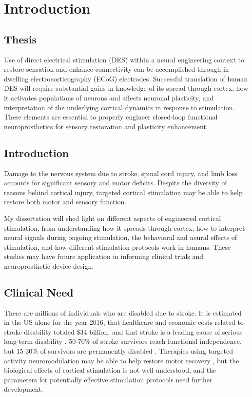 
 
\chapter {Introduction}

\section {Thesis}

Use of direct electrical stimulation (DES) within a neural engineering context to restore sensation and enhance connectivity can be accomplished through in-dwelling electrocorticography (ECoG) electrodes.  Successful translation of human DES will require substantial gains in knowledge of its spread through cortex, how it activates populations of neurons and affects neuronal plasticity, and interpretation of the underlying cortical dynamics in response to stimulation. These elements are essential to properly engineer closed-loop functional neuroprosthetics for sensory restoration and plasticity enhancement.  

\section{Introduction}

Damage to the nervous system due to stroke, spinal cord injury, and limb loss accounts for significant sensory and motor deficits. Despite the diversity of reasons behind cortical injury, targeted cortical stimulation may be able to help restore both motor and sensory function.  

My dissertation will shed light on different aspects of engineered cortical stimulation, from understanding how it spreads through cortex, how to interpret neural signals during ongoing stimulation, the behavioral and neural effects of stimulation, and how different stimulation protocols work in humans. These studies may have future application in informing clinical trials and neuroprosthetic device design. 

\section{Clinical Need}

There are millions of individuals who are disabled due to stroke. It is estimated in the US alone for the year 2016, that healthcare and economic costs related to stroke disability totaled \$34 billion, and that stroke is a leading cause of serious long-term disability \cite{CDC2015}. 50-70\% of stroke survivors reach functional independence, but 15-30\% of survivors are permanently disabled \cite{Lloyd-Jones2010}. Therapies using targeted activity neuromodulation may be able to help restore motor recovery \cite{HarveyRL.WinsteinCJ.EverestTrial2009}, but the biological effects of cortical stimulation is not well understood, and the parameters for potentially effective stimulation protocols need further development.  

